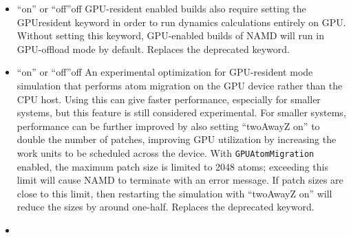 \begin{itemize}
\setlength{\itemsep}{0.4cm}

\item
{}%
{``on'' or ``off''}{off}{%
GPU-resident enabled builds also require setting the GPUresident keyword
in order to run dynamics calculations entirely on GPU. Without setting this 
keyword, GPU-enabled builds of NAMD will run in GPU-offload mode by default.
Replaces the deprecated \texttt{} keyword.
}

\item
{}%
{``on'' or ``off''}{off}{%
An experimental optimization for GPU-resident mode simulation
that performs atom migration on the GPU device rather than the CPU host.
Using this can give faster performance, especially for smaller systems,
but this feature is still considered experimental.
For smaller systems, performance can be further improved by also 
setting ``twoAwayZ on'' to double the number of patches,
improving GPU utilization by
increasing the work units to be scheduled across the device.
With \texttt{GPUAtomMigration} enabled,
the maximum patch size is limited to 2048 atoms;
exceeding this limit will cause NAMD to terminate with an error message.
If patch sizes are close to this limit, then restarting the simulation
with ``twoAwayZ on'' will reduce the sizes by around one-half.
Replaces the deprecated \texttt{} keyword.
}

\item
{}


\end{itemize}
